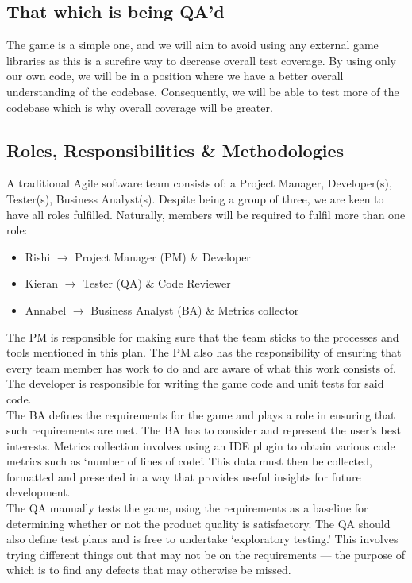 \documentclass[12pt]{article}
\begin{document}
 \subsection{That which is being QA'd}
 The game is a simple one, and we will aim to avoid using any external game libraries as this is a surefire way to decrease overall test coverage. By using only our own code, we will be in a position where we have a better overall understanding of the codebase. Consequently, we will be able to test more of the codebase which is why overall coverage will be greater.
 
 \subsection{Roles, Responsibilities \& Methodologies}
 A traditional Agile software team consists of: a Project Manager, Developer(s), Tester(s), Business Analyst(s). Despite being a group of three, we are keen to have all roles fulfilled. Naturally, members will be required to fulfil more than one role:
 
 \begin{itemize}
     \item Rishi $\longrightarrow$ Project Manager (PM) \& Developer
     \item Kieran $\longrightarrow$ Tester (QA) \& Code Reviewer
     \item Annabel $\longrightarrow$ Business Analyst (BA) \& Metrics collector
 \end{itemize}
 
The PM is responsible for making sure that the team sticks to the processes and tools mentioned in this plan. The PM also has the responsibility of ensuring that every team member has work to do and are aware of what this work consists of. The developer is responsible for writing the game code and unit tests for said code. \\
 
The BA defines the requirements for the game and plays a role in ensuring that such requirements are met. The BA has to consider and represent the user's best interests. Metrics collection involves using an IDE plugin to obtain various code metrics such as `number of lines of code'. This data must then be collected, formatted and presented in a way that provides useful insights for future development. \\
 
The QA manually tests the game, using the requirements as a baseline for determining whether or not the product quality is satisfactory. The QA should also define test plans and is free to undertake `exploratory testing.' This involves trying different things out that may not be on the requirements --- the purpose of which is to find any defects that may otherwise be missed. \\
\end{document}
